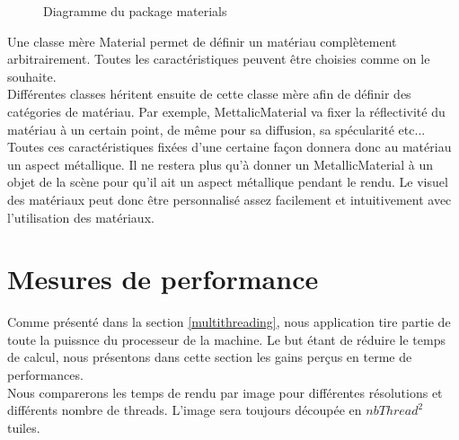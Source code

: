 \documentclass[11pt]{article}
\begin{document}
\begin{figure}[h!]
	
	\caption{Diagramme du package materials}
	\label{diagrammePackageMaterials}
\end{figure}
\FloatBarrier

Une classe mère Material permet de définir un matériau complètement arbitrairement. Toutes les caractéristiques peuvent être choisies comme on le souhaite.\\
Différentes classes héritent ensuite de cette classe mère afin de définir des catégories de matériau. Par exemple, MettalicMaterial va fixer la réflectivité du matériau à un certain point, de même pour sa diffusion, sa spécularité etc... Toutes ces caractéristiques fixées d'une certaine façon donnera donc au matériau un aspect métallique. Il ne restera plus qu'à donner un MetallicMaterial à un objet de la scène pour qu'il ait un aspect métallique pendant le rendu. Le visuel des matériaux peut donc être personnalisé assez facilement et intuitivement avec l'utilisation des matériaux.

\section{Mesures de performance}
Comme présenté dans la section \ref{multithreading}, nous application tire partie de toute la puissnce du processeur de la machine. Le but étant de réduire le temps de calcul, nous présentons dans cette section les gains perçus en terme de performances.\\
Nous comparerons les temps de rendu par image pour différentes résolutions et différents nombre de threads. L'image sera toujours découpée en $nbThread^2$ tuiles.
\end{document}

